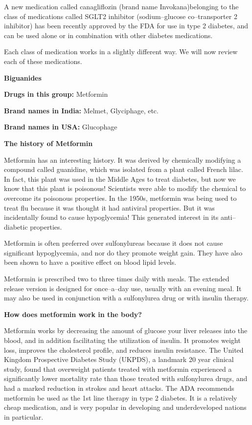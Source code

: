 A new medication called canagliflozin (brand name Invokana)\break belonging to the class of medications called SGLT2 inhibitor (sodium–glucose co–transporter 2 inhibitor) has been recently approved by the FDA for use in type 2 diabetes, and can be used alone or in combination with other diabetes medications.

Each class of medication works in a slightly different way. We will now review each of these medications.

\vskip 6pt

\textbf{Biguanides}

\textbf{Drugs in this group:} Metformin

\textbf{Brand names in India:} Melmet, Glyciphage, etc.

\textbf{Brand names in USA:} Glucophage

\noindent\textbf{The history of Metformin}

Metformin has an interesting history. It was derived by chemi\-cally modifying a compound called guanidine, which was isolated from a plant called French lilac. In fact, this plant was used in the Middle Ages to treat diabetes, but now we know that this plant is poiso\-nous! Scie\-ntists were able to modify the chemical to overcome its poisonous properties. In the 1950s, metformin was being used to treat flu because it was thought it had antiviral properties. But it was inci\-de\-ntally found to cause hypoglycemia! This generated interest in its anti–diabetic properties.

Metformin is often preferred over sulfonylureas because it does not cause significant hypoglycemia, and nor do they promote weight gain. They have also been shown to have a positive effect on blood lipid levels.

Metformin is prescribed two to three times daily with meals. The extended release version is designed for once–a–day use, usually with an evening meal. It may also be used in conjunction with a sulfonylurea drug or with insulin therapy.

\noindent\textbf{How does metformin work in the body?}

Metformin works by decreasing the amount of glucose your liver releases into the blood, and in addition facilitating the utilization of insulin. It promotes weight loss, improves the cholesterol profile, and reduces insulin resistance. The United Kingdom Prospective Diabetes Study (UKPDS), a landmark 20 year clinical study, found that overweight patients treated with metformin experienced a significantly lower mortality rate than those treated with sulfonylurea drugs, and had a marked reduction in strokes and heart attacks. The ADA reco\-mmends metformin be used as the 1st line therapy in type 2 diabetes. It is a relatively cheap medication, and is very popular in developing and underdeveloped nations in particular.

